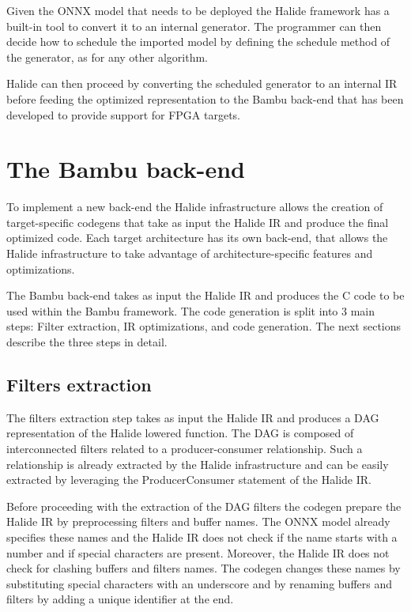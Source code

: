\documentclass[../main.tex]{subfiles}
\begin{document}
Given the ONNX model that needs to be deployed the Halide framework has a built-in tool to convert it to an internal generator. The programmer can then decide how to schedule the imported model by defining the schedule method of the generator, as for any other algorithm. 

Halide can then proceed by converting the scheduled generator to an internal IR before feeding the optimized representation to the Bambu back-end that has been developed to provide support for FPGA targets.


\section{The Bambu back-end}
\label {back-end}
To implement a new back-end the Halide infrastructure allows the creation of target-specific codegens that take as input the Halide IR and produce the final optimized code. Each target architecture has its own back-end, that allows the Halide infrastructure to take advantage of architecture-specific features and optimizations.

The Bambu back-end takes as input the Halide IR and produces the C code to be used within the Bambu framework. The code generation is split into 3 main steps: Filter extraction, IR optimizations, and code generation. The next sections describe the three steps in detail.

\subsection{Filters extraction}

The filters extraction step takes as input the Halide IR and produces a DAG representation of the Halide lowered function. 
The DAG is composed of interconnected filters related to a producer-consumer relationship. 
Such a relationship is already extracted by the Halide infrastructure and can be easily extracted by leveraging the ProducerConsumer statement of the Halide IR.

Before proceeding with the extraction of the DAG filters the codegen prepare the Halide IR by preprocessing filters and buffer names.
The ONNX model already specifies these names and the Halide IR does not check if the name starts with a number and if special characters are present.
Moreover, the Halide IR does not check for clashing buffers and filters names.
The codegen changes these names by substituting special characters with an underscore and by renaming buffers and filters by adding a unique identifier at the end.
\end{document}
